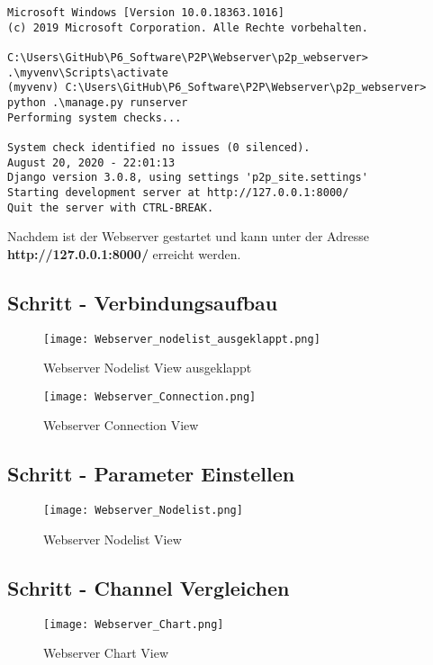 \begin{lstlisting}[style=DOS]
Microsoft Windows [Version 10.0.18363.1016]
(c) 2019 Microsoft Corporation. Alle Rechte vorbehalten.

C:\Users\GitHub\P6_Software\P2P\Webserver\p2p_webserver> .\myvenv\Scripts\activate
(myvenv) C:\Users\GitHub\P6_Software\P2P\Webserver\p2p_webserver> python .\manage.py runserver
Performing system checks...
	
System check identified no issues (0 silenced).
August 20, 2020 - 22:01:13
Django version 3.0.8, using settings 'p2p_site.settings'
Starting development server at http://127.0.0.1:8000/   
Quit the server with CTRL-BREAK.
\end{lstlisting}

Nachdem ist der Webserver gestartet und kann unter der Adresse \textbf{http://127.0.0.1:8000/} erreicht werden.

\subsection{Schritt - Verbindungsaufbau}\label{sec:SchrittVerbindungsaufbau}

\begin{figure} [H]
	\centering
	\texttt{[image: Webserver\_nodelist\_ausgeklappt.png]}
	\caption{Webserver Nodelist View ausgeklappt}
	\label{fig:WebserverNodelistViewausgeklappt}
\end{figure}

\begin{figure} [H]
	\centering
	\texttt{[image: Webserver\_Connection.png]}
	\caption{Webserver Connection View}
	\label{fig:WebserverConnectionView}
\end{figure}


\subsection{Schritt - Parameter Einstellen}\label{sec:SchrittParameterEinstellen}
\begin{figure} [H]
	\centering
	\texttt{[image: Webserver\_Nodelist.png]}
	\caption{Webserver Nodelist View}
	\label{fig:WebserverNodelistView}
\end{figure}

\subsection{Schritt - Channel Vergleichen}\label{sec:SchrittChannelVergleichen}
\begin{figure} [H]
	\centering
	\texttt{[image: Webserver\_Chart.png]}
	\caption{Webserver Chart View}
	\label{fig:WebserverChartView}
\end{figure}




